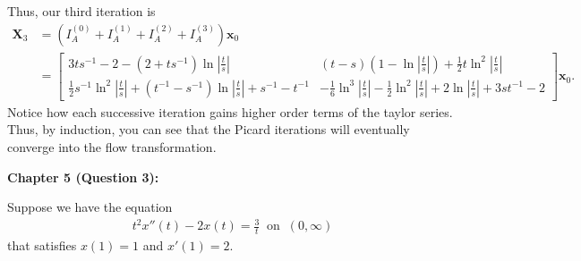 \documentclass[12pt]{article}
\begin{document}
Thus, our third iteration is
\begin{align*}
    \mathbf{X}_3 & = (I_A^{(0)} + I_A^{(1)} + I_A^{(2)} + I_A^{(3)}) \mathbf{x}_0                                                                                                                                    \\
                 & = \begin{bmatrix}
                         3ts^{-1} - 2 - (2+ts^{-1}) \ln|\frac{t}{s}|                                             & (t - s)(1 - \ln|\frac{t}{s}|) + \frac{1}{2}t\ln^2|\frac{t}{s}|                                    \\
                         \frac{1}{2}s^{-1}\ln^2|\frac{t}{s}| + (t^{-1}-s^{-1})\ln|\frac{t}{s}| + s^{-1} - t^{-1} & -\frac{1}{6}\ln^3|\frac{t}{s}| - \frac{1}{2}\ln^2|\frac{t}{s}| + 2\ln|\frac{t}{s}| + 3st^{-1} - 2
                     \end{bmatrix} \mathbf{x}_0.
\end{align*}
Notice how each successive iteration gains higher order terms of the taylor series.
Thus, by induction, you can see that the Picard iterations will eventually converge into the flow transformation.

\vspace{5ex}

\noindent \textbf{Chapter 5 (Question 3):}

Suppose we have the equation
\begin{align*}
    t^2x''(t) - 2x(t) = \frac{3}{t} ~ \text{ on } ~ (0 , \infty)
\end{align*}
that satisfies  $x(1) = 1$ and $x'(1) = 2$.
\end{document}
